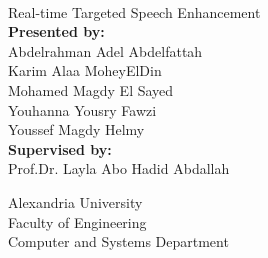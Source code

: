 \begin{titlepage}
        \begin{center}
                \\[0.5cm]
                \linespread{1.2}\huge {Real-time Targeted Speech Enhancement}\\[0.5cm]

                \textbf{\Large {Presented by:}}\\[0.1cm]
                {\Large{Abdelrahman Adel Abdelfattah}}\\
                {\Large{Karim Alaa MoheyElDin}}\\
                {\Large{Mohamed Magdy El Sayed}}\\
                {\Large{Youhanna Yousry Fawzi}}\\
                {\Large{Youssef Magdy Helmy}}\\[0.5cm]

                \textbf{\Large {Supervised by:}}\\[0.1cm]
                \Large {Prof.Dr. Layla Abo Hadid Abdallah}\\[0.5cm]

                \vfill

                {\Large{Alexandria University}}\\
                {\Large{Faculty of Engineering}}\\
                {\Large{Computer and Systems Department}}\\
        \end{center}
\end{titlepage}